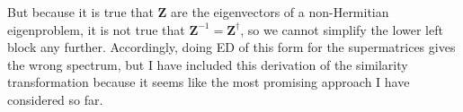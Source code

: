 But because it is true that $\bm{Z}$ are the eigenvectors of a non-Hermitian eigenproblem, it is not true that $\bm{Z}^{-1} = \bm{Z}^{\dagger}$, so we cannot simplify the lower left block any further.
Accordingly, doing ED of this form for the supermatrices gives the wrong spectrum, but I have included this derivation of the similarity transformation because it seems like the most promising approach I have considered so far.
